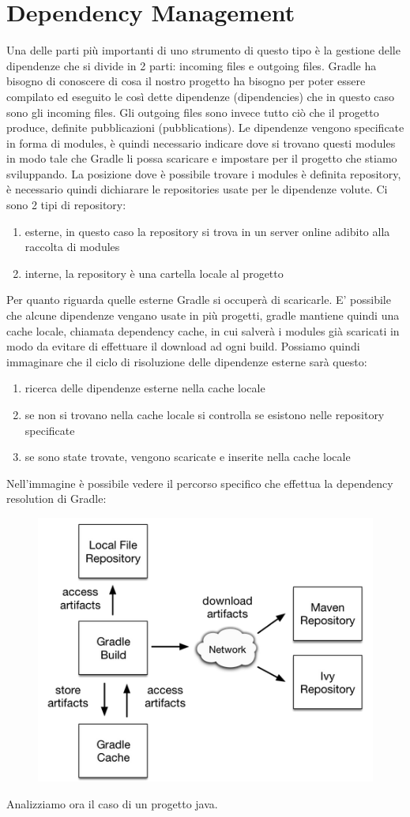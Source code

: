 \section{Dependency Management}
Una delle parti più importanti di uno strumento di questo tipo è la gestione delle dipendenze che si divide in 2 parti: incoming files e outgoing files. Gradle ha bisogno di conoscere di cosa il nostro progetto ha bisogno per poter essere compilato ed eseguito le così dette dipendenze (dipendencies) che in questo caso sono gli incoming files. Gli outgoing files sono invece tutto ciò che il progetto produce, definite pubblicazioni (pubblications). Le dipendenze vengono specificate in forma di modules, è quindi necessario indicare dove si trovano questi modules in modo tale che Gradle li possa scaricare e impostare per il progetto che stiamo sviluppando. La posizione dove è possibile trovare i modules è definita repository, è necessario quindi dichiarare le repositories usate per le dipendenze volute. Ci sono 2 tipi di repository: 
\begin{enumerate}
    \item esterne, in questo caso la repository si trova in un server online adibito alla raccolta di modules
    \item interne, la repository è una cartella locale al progetto
\end{enumerate}
Per quanto riguarda quelle esterne Gradle si occuperà di scaricarle. E' possibile che alcune dipendenze vengano usate in più progetti, gradle mantiene quindi una cache locale, chiamata dependency cache, in cui salverà i modules già scaricati in modo da evitare di effettuare il download ad ogni build. Possiamo quindi immaginare che il ciclo di risoluzione delle dipendenze esterne sarà questo:
\begin{enumerate}
    \item ricerca delle dipendenze esterne nella cache locale
    \item se non si trovano nella cache locale si controlla se esistono nelle repository specificate
    \item se sono state trovate, vengono scaricate e inserite nella cache locale
\end{enumerate}
Nell'immagine è possibile vedere il percorso specifico che effettua la dependency resolution di Gradle:
\begin{figure}[H]
\centering
\includegraphics[width=0.4\linewidth]{HowToUse/3DependencyManagement/depMan.png}
\end{figure}
Analizziamo ora il caso di un progetto java.

